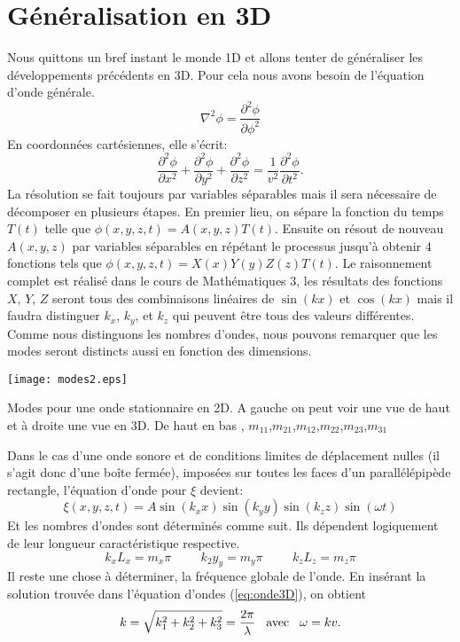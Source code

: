 \section{Généralisation en 3D}
Nous quittons un bref instant le monde 1D et allons tenter de généraliser les développements précédents en 3D. Pour cela nous avons besoin de l'équation d'onde générale. 
$$ \nabla^2 \phi = \frac{\partial^2\phi}{\partial\phi^2}$$
En coordonnées cartésiennes, elle s'écrit:
\begin{equation}
\frac{\partial^2\phi}{\partial x^2}+\frac{\partial^2\phi}{\partial y^2}+\frac{\partial^2\phi}{\partial z^2} = \frac{1}{v^2}\frac{\partial^2\phi}{\partial t^2}.
\label{eq:onde3D}
\end{equation}
La résolution se fait toujours par variables séparables mais il sera nécessaire de décomposer en plusieurs étapes. En premier lieu, on sépare la fonction du temps $T(t)$ telle que $\phi(x,y,z,t)=A(x,y,z)T(t)$. Ensuite on résout de nouveau $A(x,y,z)$ par variables séparables en répétant le processus jusqu'à obtenir 4 fonctions tels que $\phi(x,y,z,t)=X(x)Y(y)Z(z)T(t)$. Le raisonnement complet est réalisé dans le cours de Mathématiques 3, les résultats des fonctions $X$, $Y$, $Z$ seront tous des combinaisons linéaires de $\sin(kx)$ et $\cos(kx)$ mais il faudra distinguer $k_x$, $k_y$, et $k_z$ qui peuvent être tous des valeurs différentes. Comme nous distinguons les nombres d'ondes, nous pouvons remarquer que les modes seront distincts aussi en fonction des dimensions. 
\begin{marginfigure}
\begin{center}
\texttt{[image: modes2.eps]}
\end{center}
\caption{Modes pour une onde stationnaire en 2D. A gauche on peut voir une vue de haut et à droite une vue en 3D. De haut en bas , $m_{11}$,$m_{21}$,$m_{12}$,$m_{22}$,$m_{23}$,$m_{31}$}
\end{marginfigure}
Dans le cas d'une onde sonore et de conditions limites de déplacement nulles (il s'agit donc d'une boîte fermée), imposées sur toutes les faces d'un parallélépipède rectangle, l'équation d'onde pour $\xi$ devient: 
$$\xi(x,y,z,t)= A\sin(k_xx)\sin(k_yy)\sin(k_zz)\sin(\omega t)$$
Et les nombres d'ondes sont déterminés comme suit. Ils dépendent logiquement de leur longueur caractéristique respective.
$$ k_xL_x = m_x\pi \hspace{1cm} k_2y_y = m_y\pi \hspace{1cm} k_zL_z = m_z\pi$$
Il reste une chose à déterminer, la fréquence globale de l'onde. En insérant la solution trouvée dans l'équation d'ondes (\ref{eq:onde3D}), on obtient
$$ k = \sqrt{k_1^2+k_2^2+k_3^2} =\frac{2\pi}{\lambda}\hspace{3mm}\mbox{avec} \hspace{3mm} \omega = kv.$$ 

